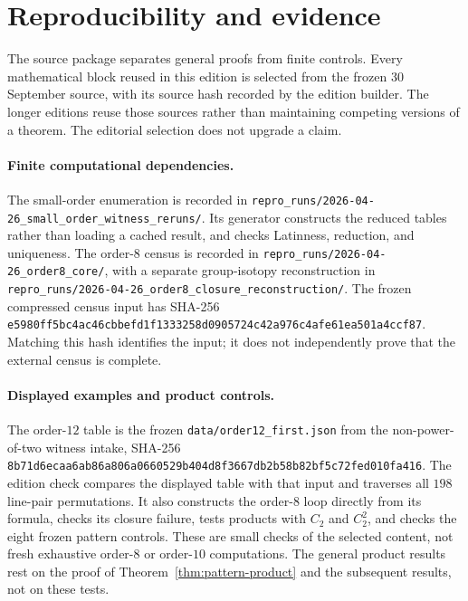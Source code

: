 \section{Reproducibility and evidence}\label{sec:reproducibility}

The source package separates general proofs from finite controls. Every
mathematical block reused in this edition is selected from the frozen
30 September source, with its source hash recorded by the edition builder.
The longer editions reuse those sources rather than maintaining competing
versions of a theorem. The editorial selection does not upgrade a claim.

\paragraph{Finite computational dependencies.}
The small-order enumeration is recorded in
\nolinkurl{repro_runs/2026-04-26_small_order_witness_reruns/}.
Its generator constructs the reduced tables rather than loading a cached
result, and checks Latinness, reduction, and uniqueness. The order-$8$
census is recorded in \nolinkurl{repro_runs/2026-04-26_order8_core/},
with a separate group-isotopy reconstruction in
\nolinkurl{repro_runs/2026-04-26_order8_closure_reconstruction/}.
The frozen compressed census input has SHA-256
\nolinkurl{e5980ff5bc4ac46cbbefd1f1333258d0905724c42a976c4afe61ea501a4ccf87}.
Matching this hash identifies the input; it does not independently prove
that the external census is complete.

\paragraph{Displayed examples and product controls.}
The order-$12$ table is the frozen \nolinkurl{data/order12_first.json}
from the non-power-of-two witness intake, SHA-256
\nolinkurl{8b71d6ecaa6ab86a806a0660529b404d8f3667db2b58b82bf5c72fed010fa416}.
The edition check compares the displayed table with that input and traverses
all $198$ line-pair permutations. It also constructs the order-$8$ loop
directly from its formula, checks its closure failure, tests products with
$C_2$ and $C_2^2$, and checks the eight frozen pattern controls.
These are small checks of the selected content, not fresh exhaustive
order-$8$ or order-$10$ computations. The general product results rest on
the proof of Theorem~\ref{thm:pattern-product} and the subsequent results,
not on these tests.

